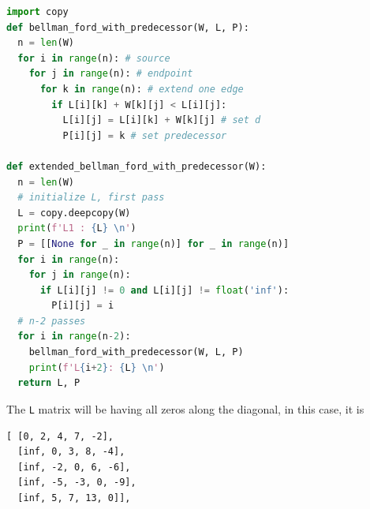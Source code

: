 \documentclass[../main.tex]{subfiles}
\begin{document}
\begin{lstlisting}[language=Python]
import copy
def bellman_ford_with_predecessor(W, L, P):
  n = len(W)
  for i in range(n): # source
    for j in range(n): # endpoint
      for k in range(n): # extend one edge
        if L[i][k] + W[k][j] < L[i][j]:
          L[i][j] = L[i][k] + W[k][j] # set d
          P[i][j] = k # set predecessor
  
def extended_bellman_ford_with_predecessor(W):
  n = len(W)
  # initialize L, first pass
  L = copy.deepcopy(W)
  print(f'L1 : {L} \n')
  P = [[None for _ in range(n)] for _ in range(n)]
  for i in range(n):
    for j in range(n):
      if L[i][j] != 0 and L[i][j] != float('inf'):
        P[i][j] = i
  # n-2 passes
  for i in range(n-2):
    bellman_ford_with_predecessor(W, L, P)
    print(f'L{i+2}: {L} \n')
  return L, P
\end{lstlisting}
The \texttt{L} matrix will be having all zeros along the diagonal, in this case, it is
\begin{lstlisting}[numbers=none]
[ [0, 2, 4, 7, -2],
  [inf, 0, 3, 8, -4],
  [inf, -2, 0, 6, -6],
  [inf, -5, -3, 0, -9],
  [inf, 5, 7, 13, 0]],
\end{lstlisting}
\end{document}
